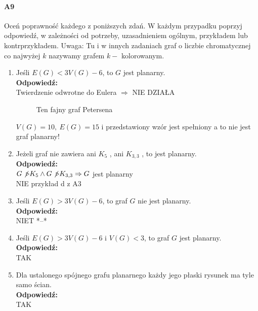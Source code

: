 \paragraph{A9} Oceń poprawność każdego z poniższych zdań. W każdym przypadku poprzyj odpowiedź, w zależności od potrzeby, uzasadnieniem ogólnym, przykładem lub kontrprzykładem. Uwaga: Tu i w innych zadaniach
graf o liczbie chromatycznej co najwyżej $k$ nazywamy grafem $k-$ kolorowanym.
\begin{enumerate}[label=\alph*)]
\item Jeśli $E(G) < 3V(G) - 6$, to $G$ jest planarny.
\\\textbf{Odpowiedź:} \\
Twierdzenie odwrotne do Eulera $\Rightarrow$ NIE DZIAŁA 
\begin{figure}[H]
\centering
{}
\caption*{Ten fajny graf Petersena}
\end{figure}
$V(G)=10,\ E(G)=15$ i przedstawiony wzór jest spełniony a to nie jest graf planarny!

\item Jeżeli graf nie zawiera ani $K_5$ , ani $K_{3,3}$ , to jest planarny.
\\\textbf{Odpowiedź:} \\
$G \not \triangleright K_5 \land G \not \triangleright K_{3,3} \Rightarrow G $ jest planarny\\
NIE przykład d z A3

\item Jeśli $E(G) > 3V(G) - 6$, to graf $G$ nie jest planarny.
\\\textbf{Odpowiedź:} \\
NIET *--*

\item Jeśli $E(G) > 3V(G) - 6$ i $V(G) < 3$, to graf $G$ jest planarny.
\\\textbf{Odpowiedź:} \\ TAK

\item Dla ustalonego spójnego grafu planarnego każdy jego płaski rysunek ma tyle samo ścian.
\\\textbf{Odpowiedź:} \\  TAK


\end{enumerate}
